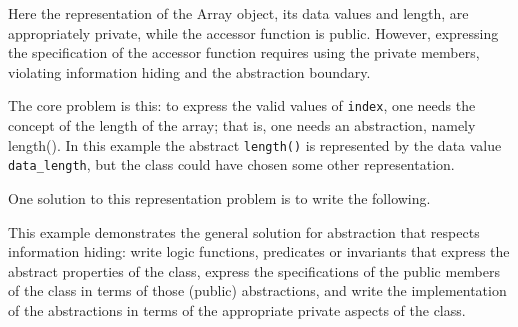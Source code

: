 Here the representation of the Array object, its data values and length, are appropriately private, while the accessor function is public.
However, expressing the specification of the accessor function requires using the private members, violating information hiding and
the abstraction boundary.

The core problem is this: to express the valid values of \lstinline|index|, one needs the concept of the length of the array; that is, one needs an abstraction, namely length(). In this example the abstract \lstinline|length()| is represented by the data value \lstinline|data_length|, but the class could have chosen some other representation.

One solution to this representation problem is to write the following.



This example demonstrates the general solution for abstraction that respects information hiding: write logic functions, predicates or invariants that express the abstract properties of the class, express the specifications of the public members of the class in terms of those (public) abstractions, and write the implementation of the abstractions in terms of the appropriate private aspects of the class.

